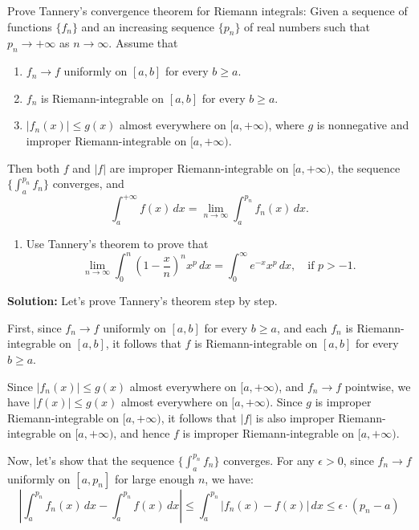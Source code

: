 \begin{problembox}
Prove Tannery's convergence theorem for Riemann integrals: Given a sequence of functions $\{f_n\}$ and an increasing sequence $\{p_n\}$ of real numbers such that $p_n \to +\infty$ as $n \to \infty$. Assume that
\begin{enumerate}[label=(\alph*)]
    \item $f_n \to f$ uniformly on $[a,b]$ for every $b \geq a$.
    \item $f_n$ is Riemann-integrable on $[a,b]$ for every $b \geq a$.
    \item $|f_n(x)| \leq g(x)$ almost everywhere on $[a,+\infty)$, where $g$ is nonnegative and improper Riemann-integrable on $[a,+\infty)$.
\end{enumerate}
Then both $f$ and $|f|$ are improper Riemann-integrable on $[a,+\infty)$, the sequence $\{\int_a^{p_n} f_n\}$ converges, and
\[\int_{a}^{+\infty} f(x) \, dx = \lim_{n \to \infty} \int_{a}^{p_n} f_n(x) \, dx.\]

\begin{enumerate}[label=(\alph*),resume]
    \item Use Tannery's theorem to prove that
    \[\lim_{n \to \infty} \int_{0}^{n} \left( 1 - \frac{x}{n} \right)^n x^p \, dx = \int_{0}^{\infty} e^{-x}x^p \, dx, \quad \text{if } p > -1.\]
\end{enumerate}
\end{problembox}

\bigskip\noindent\textbf{Solution:}
Let's prove Tannery's theorem step by step.

First, since $f_n \to f$ uniformly on $[a,b]$ for every $b \geq a$, and each $f_n$ is Riemann-integrable on $[a,b]$, it follows that $f$ is Riemann-integrable on $[a,b]$ for every $b \geq a$.

Since $|f_n(x)| \leq g(x)$ almost everywhere on $[a,+\infty)$, and $f_n \to f$ pointwise, we have $|f(x)| \leq g(x)$ almost everywhere on $[a,+\infty)$. Since $g$ is improper Riemann-integrable on $[a,+\infty)$, it follows that $|f|$ is also improper Riemann-integrable on $[a,+\infty)$, and hence $f$ is improper Riemann-integrable on $[a,+\infty)$.

Now, let's show that the sequence $\{\int_a^{p_n} f_n\}$ converges. For any $\epsilon > 0$, since $f_n \to f$ uniformly on $[a, p_n]$ for large enough $n$, we have:
\[|\int_a^{p_n} f_n(x) \, dx - \int_a^{p_n} f(x) \, dx| \leq \int_a^{p_n} |f_n(x) - f(x)| \, dx \leq \epsilon \cdot (p_n - a)\]

